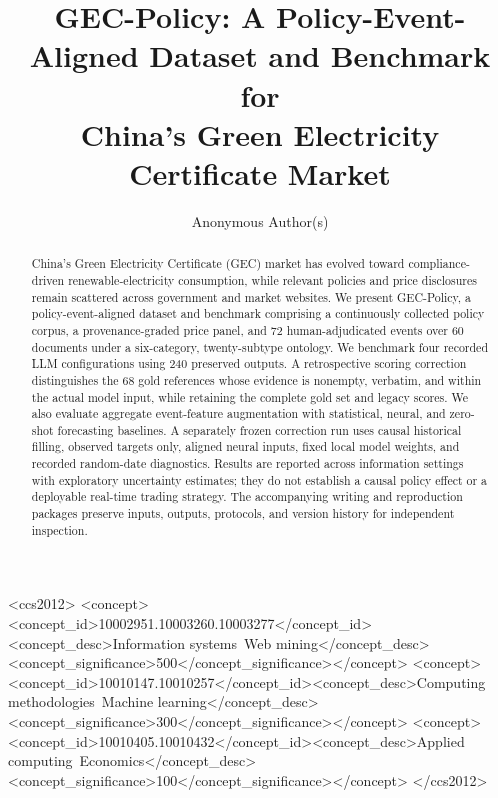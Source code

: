 \documentclass[sigconf,anonymous,review]{acmart}
\newcommand{\dataset}{GEC-Policy\xspace}
\begin{document}
\title{\dataset: A Policy-Event-Aligned Dataset and Benchmark for\\China's Green Electricity Certificate Market}

\author{Anonymous Author(s)}

\begin{abstract}
China's Green Electricity Certificate (GEC) market has evolved toward compliance-driven renewable-electricity consumption, while relevant policies and price disclosures remain scattered across government and market websites. We present \dataset, a policy-event-aligned dataset and benchmark comprising a continuously collected policy corpus, a provenance-graded price panel, and 72 human-adjudicated events over 60 documents under a six-category, twenty-subtype ontology. We benchmark four recorded LLM configurations using 240 preserved outputs. A retrospective scoring correction distinguishes the 68 gold references whose evidence is nonempty, verbatim, and within the actual model input, while retaining the complete gold set and legacy scores. We also evaluate aggregate event-feature augmentation with statistical, neural, and zero-shot forecasting baselines. A separately frozen correction run uses causal historical filling, observed targets only, aligned neural inputs, fixed local model weights, and recorded random-date diagnostics. Results are reported across information settings with exploratory uncertainty estimates; they do not establish a causal policy effect or a deployable real-time trading strategy. The accompanying writing and reproduction packages preserve inputs, outputs, protocols, and version history for independent inspection.
\end{abstract}


\begin{CCSXML}
<ccs2012>
<concept><concept_id>10002951.10003260.10003277</concept_id><concept_desc>Information systems~Web mining</concept_desc><concept_significance>500</concept_significance></concept>
<concept><concept_id>10010147.10010257</concept_id><concept_desc>Computing methodologies~Machine learning</concept_desc><concept_significance>300</concept_significance></concept>
<concept><concept_id>10010405.10010432</concept_id><concept_desc>Applied computing~Economics</concept_desc><concept_significance>100</concept_significance></concept>
</ccs2012>
\end{CCSXML}
\end{document}
